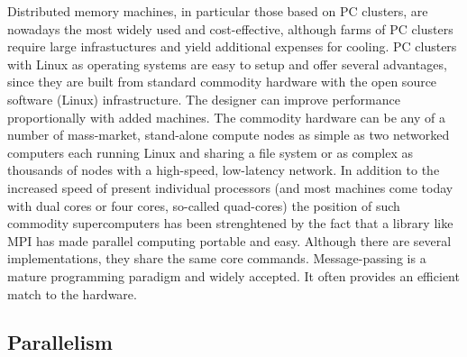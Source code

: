 Distributed memory machines, in particular those based on PC clusters, are nowadays the most widely used
and cost-effective, although farms of PC clusters require large infrastuctures and yield additional expenses
for cooling. PC clusters with Linux as operating systems are easy to setup and offer several advantages,
since they are built from standard 
commodity hardware with the open source software (Linux) infrastructure. 
The designer can improve performance proportionally with added machines. 
The commodity hardware can be any of a number of mass-market, stand-alone compute nodes 
as simple as two networked computers each running Linux and sharing a file system or as complex as
thousands of nodes with a high-speed, low-latency network.
In addition to the increased speed of present  individual processors (and most machines come today with dual cores or four cores, so-called quad-cores)
the position of such commodity supercomputers has been strenghtened by the fact  
that a library like MPI has made parallel computing portable and easy. Although there are several implementations,
they share the same core commands. 
Message-passing is a mature programming paradigm and widely
accepted. It often provides an efficient match to the hardware.




\subsection{Parallelism}

